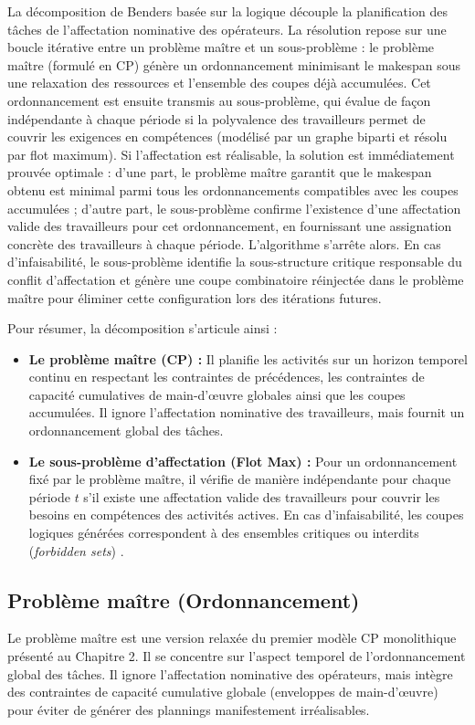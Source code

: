 La décomposition de Benders basée sur la logique découple la planification des tâches de l'affecta\-tion nominative des opérateurs. La résolution repose sur une boucle itérative entre un problème maître et un sous-problème : le problème maître (formulé en CP) génère un ordonnancement minimisant le makespan sous une relaxation des ressources et l'ensemble des coupes déjà accumulées. Cet ordonnancement est ensuite transmis au sous-problème, qui évalue de façon indépendante à chaque période si la polyvalence des travailleurs permet de couvrir les exigences en compétences (modélisé par un graphe biparti et résolu par flot maximum). Si l'affectation est réalisable, la solution est immédiatement prouvée optimale : d'une part, le problème maître garantit que le makespan obtenu est minimal parmi tous les ordonnancements compatibles avec les coupes accumulées ; d'autre part, le sous-problème confirme l'existence d'une affectation valide des travailleurs pour cet ordonnancement, en fournissant une assignation concrète des travailleurs à chaque période. L'algorithme s'arrête alors. En cas d'infaisabilité, le sous-problème identifie la sous-structure critique responsable du conflit d'affectation et génère une coupe combinatoire réinjectée dans le problème maître pour éliminer cette configuration lors des itérations futures.

\smallskip
\noindent Pour résumer, la décomposition s'articule ainsi :
\begin{itemize}
    \item \textbf{Le problème maître (CP) :} Il planifie les activités sur un horizon temporel continu en respectant les contraintes de précédences, les contraintes de capacité cumulatives de main-d'œuvre globales ainsi que les coupes accumulées. Il ignore l'affectation nominative des travailleurs, mais fournit un ordonnancement global des tâches.
    \item \textbf{Le sous-problème d'affectation (Flot Max) :} Pour un ordonnancement fixé par le problème maître, il vérifie de manière indépendante pour chaque période $t$ s'il existe une affectation valide des travailleurs pour couvrir les besoins en compétences des activités actives. En cas d'infaisabilité, les coupes logiques générées correspondent à des ensembles critiques ou interdits (\textit{forbidden sets}) \cite{lombardi2012min, stork2005generation}.
\end{itemize}

\subsection{Problème maître (Ordonnancement)}
Le problème maître est une version relaxée du premier modèle CP monolithique présenté au Chapitre 2. Il se concentre sur l'aspect temporel de l'ordonnancement global des tâches. Il ignore l'affectation nominative des opérateurs, mais intègre des contraintes de capacité cumulative globale (enveloppes de main-d'œuvre) pour éviter de générer des plannings manifestement irréalisables.

